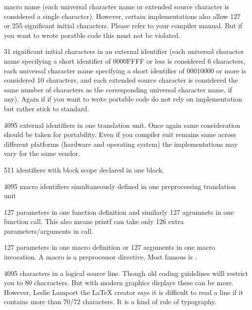   macro name (each universal character name or extended source
  character is considered a single character). However, certain
  implementations also allow 127 or 255 significant initial
  characters. Please refer to your compiler manual. But if you want to
  wrote poratble code this must not be violated.
\item 31 significant initial characters in an external identifier
  (each universal character name specifying a short identifier of
  0000FFFF or less is considered 6 characters, each universal
  character name specifying a short identifier of 00010000 or more is
  considered 10 characters, and each extended source character is
  considered the same number of characters as the corresponding
  universal character name, if any). Again if if you want to write
  portable code do not rely on implementation but rather stick to
  standard.
\item 4095 external identifiers in one translation unit. Once again
  same consideration should be taken for portability. Even if you
  compiler suit remains same across different platforms (hardware and
  operating system) the implementations may vary for the same vendor.
\item 511 identifiers with block scope declared in one block.
\item 4095 macro identifiers simultaneously defined in one
  preprocessing translation unit
\item 127 parameters in one function definition and similarly 127
  agrumnets in one function call. This also means printf can take only
  126 extra parameters/arguments in call.
\item 127 parameters in one macro definition or 127 arguments in one
  macro invocation. A macro is a preprocessor directive. Most famous
  is .
\item 4095 characters in a logical source line. Though old coding
  guidelines willl restrict you to 80 chacracters. But with modern
  graphics displays these can be more. However, Leslie Lamport the
  \LaTeX{} creator says it is difficult to read a line if it contains
  more than 70/72 characters. It is a kind of rule of typography.
 \stopitemize
